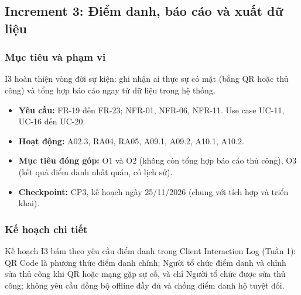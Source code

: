 \subsection{Increment 3: Điểm danh, báo cáo và xuất dữ liệu}
\label{sec:i3}

\subsubsection{Mục tiêu và phạm vi}

I3 hoàn thiện vòng đời sự kiện: ghi nhận ai thực sự có mặt (bằng QR hoặc thủ công) và tổng hợp báo cáo ngay từ dữ liệu trong hệ thống.

\begin{itemize}
    \item \textbf{Yêu cầu:} FR-19 đến FR-23; NFR-01, NFR-06, NFR-11. Use case UC-11, UC-16 đến UC-20.
    \item \textbf{Hoạt động:} A02.3, RA04, RA05, A09.1, A09.2, A10.1, A10.2.
    \item \textbf{Mục tiêu đóng góp:} O1 và O2 (không còn tổng hợp báo cáo thủ công), O3 (kết quả điểm danh nhất quán, có lịch sử).
    \item \textbf{Checkpoint:} CP3, kế hoạch ngày 25/11/2026 (chung với tích hợp và triển khai).
\end{itemize}

\subsubsection{Kế hoạch chi tiết}

Kế hoạch I3 bám theo yêu cầu điểm danh trong Client Interaction Log (Tuần 1): QR Code là phương thức điểm danh chính; Người tổ chức điểm danh và chỉnh sửa thủ công khi QR hoặc mạng gặp sự cố, và chỉ Người tổ chức được sửa thủ công; không yêu cầu đồng bộ offline đầy đủ và chống điểm danh hộ tuyệt đối.

